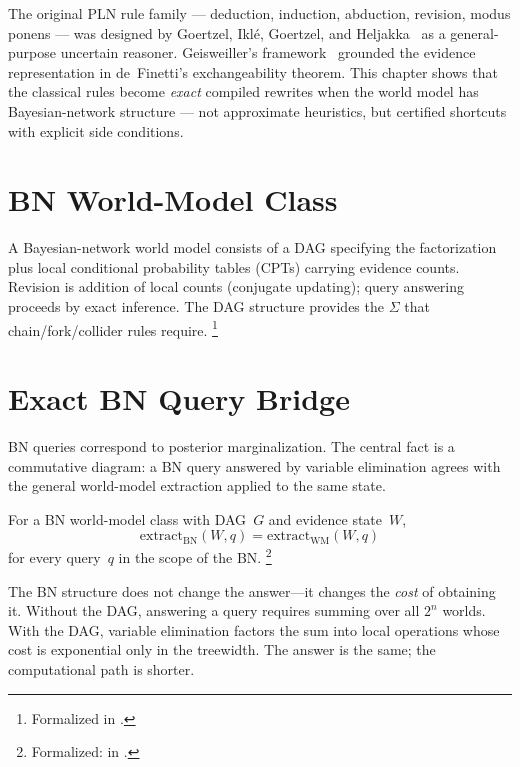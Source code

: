 \documentclass[11pt,openany]{report}
\begin{document}
The original PLN rule family --- deduction, induction, abduction,
revision, modus ponens --- was designed by Goertzel, Iklé, Goertzel,
and Heljakka~\cite{goertzel2009pln} as a general-purpose uncertain
reasoner.  Geisweiller's \nuPLN{} framework~\cite{nuPLN2026} grounded
the evidence representation in de~Finetti's exchangeability theorem.
This chapter shows that the classical rules become \emph{exact}
compiled rewrites when the world model has Bayesian-network structure
--- not approximate heuristics, but certified shortcuts with explicit
side conditions.

\section{BN World-Model Class}

A Bayesian-network world model consists of a DAG specifying the
factorization plus local conditional probability tables (CPTs) carrying
evidence counts.  Revision is addition of local counts (conjugate
updating); query answering proceeds by exact inference.  The DAG
structure provides the $\Sigma$ that chain/fork/collider rules
require.%
\footnote{Formalized in
.}


\section{Exact BN Query Bridge}

BN queries correspond to posterior marginalization.  The central
fact is a commutative diagram: a BN query answered by variable
elimination agrees with the general world-model extraction applied
to the same state.

\begin{theorem}
For a BN world-model class with DAG~$G$ and evidence state~$W$,
\[
  \mathrm{extract}_{\mathrm{BN}}(W, q) = \mathrm{extract}_{\mathrm{WM}}(W, q)
\]
for every query~$q$ in the scope of the BN.%
\footnote{Formalized:
 in
.}
\end{theorem}

\noindent
The BN structure does not change the answer---it changes the
\emph{cost} of obtaining it.  Without the DAG, answering a query
requires summing over all $2^n$ worlds.  With the DAG, variable
elimination factors the sum into local operations whose cost is
exponential only in the treewidth.  The answer is the same;
the computational path is shorter.
\end{document}
